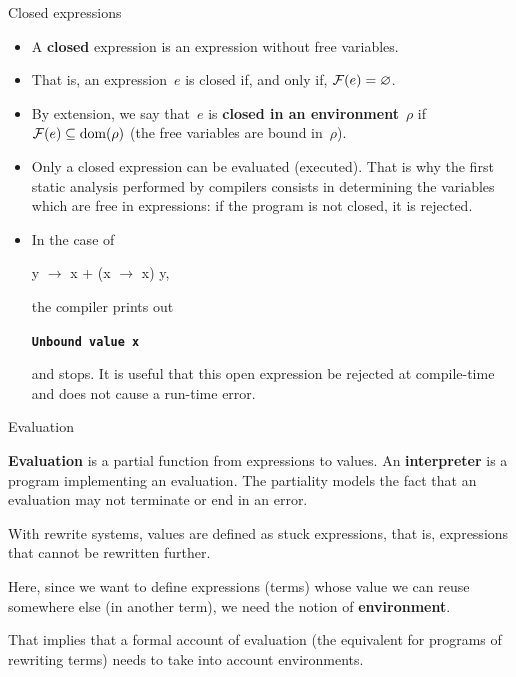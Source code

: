%
\begin{frame}{Closed expressions}

  \begin{itemize}

    \item A \textbf{closed} expression is an expression without free
      variables.

    \item That is, an expression~\(e\) is closed if, and only if,
      \(\mathcal{F}({e}) = \varnothing\).

    \item By extension, we say that~\(e\) is \textbf{closed in an
      environment}~\(\rho\) if \(\mathcal{F}({e}) \subseteq \mathrm{dom} (\rho)\) (the
      free variables are bound in~\(\rho\)).

    \item Only a closed expression can be evaluated (executed). That
      is why the first static analysis performed by compilers consists
      in determining the variables which are free in expressions: if
      the program is not closed, it is rejected.

    \item In the case of
      \begin{center}
        \Xfun y $\rightarrow$ x + (\Xfun x $\rightarrow$ x) y,
      \end{center}
      the \OCaml compiler prints out
      \begin{center}
        \texttt{\small \textbf{Unbound value x}}
      \end{center}
      and stops. It is useful that this open expression be rejected at
      compile\hyp{}time and does not cause a run\hyp{}time error.

  \end{itemize}

\end{frame}

%
\begin{frame}{Evaluation}

  \textbf{Evaluation} is a partial function from expressions to
  values. An \textbf{interpreter} is a program implementing an
  evaluation. The partiality models the fact that an evaluation may
  not terminate or end in an error.

  \bigskip

  With rewrite systems, values are defined as stuck expressions, that
  is, expressions that cannot be rewritten further.

  \bigskip

  Here, since we want to define expressions (terms) whose value we can
  reuse somewhere else (in another term), we need the notion of
  \textbf{environment}.

  \bigskip

  That implies that a formal account of evaluation (the equivalent for
  programs of rewriting terms) needs to take into account
  environments.

\end{frame}

